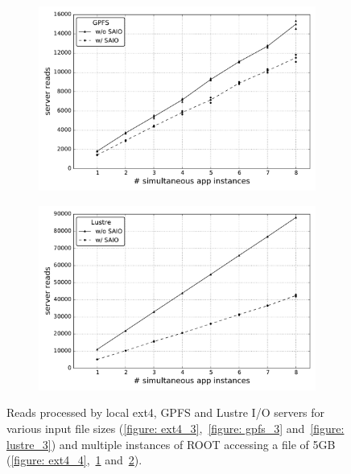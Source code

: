 \begin{figure}[!htb]
\begin{subfigure}[b]{0.32\textwidth}
    \includegraphics[width=\textwidth]{chapters/chapter2/figures/SC2015/ROOT/cluster/multiple_instances/reads_simult_instance_gpfs_test_cluster}
    \caption{\textit{}}
    \label{figure: gpfs_4}
  \end{subfigure}
  \begin{subfigure}[b]{0.32\textwidth}
    \centering
    \includegraphics[width=\textwidth]{chapters/chapter2/figures/SC2015/ROOT/cluster/multiple_instances/reads_multiple_simult_procs_Lustre_testcluster}
    \caption{\textit{}}
    \label{figure: lustre_4}
  \end{subfigure}
  \caption{Reads processed by local ext4, GPFS and Lustre I/O servers for various input file sizes (\ref{figure: ext4_3},~\ref{figure: gpfs_3} and~\ref{figure: lustre_3}) and multiple instances of ROOT accessing a file of 5GB (\ref{figure: ext4_4},~\ref{figure: gpfs_4} and~\ref{figure: lustre_4}).}
  \label{figure: read}
\end{figure}

